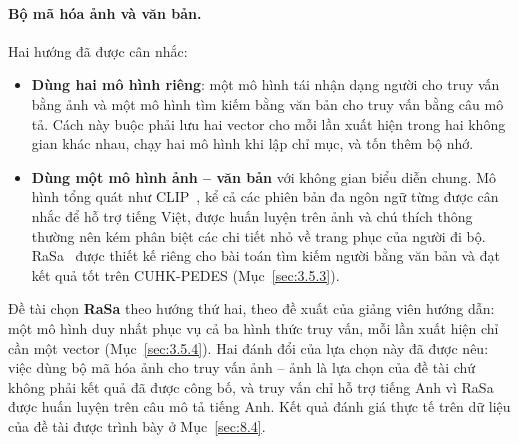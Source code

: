 \paragraph{Bộ mã hóa ảnh và văn bản.} Hai hướng đã được cân nhắc:
\begin{itemize}
    \item \textbf{Dùng hai mô hình riêng}: một mô hình tái nhận dạng người cho truy vấn bằng ảnh và một mô hình tìm kiếm bằng văn bản cho truy vấn bằng câu mô tả. Cách này buộc phải lưu hai vector cho mỗi lần xuất hiện trong hai không gian khác nhau, chạy hai mô hình khi lập chỉ mục, và tốn thêm bộ nhớ.
    \item \textbf{Dùng một mô hình ảnh -- văn bản} với không gian biểu diễn chung. Mô hình tổng quát như CLIP~\cite{radford2021clip}, kể cả các phiên bản đa ngôn ngữ từng được cân nhắc để hỗ trợ tiếng Việt, được huấn luyện trên ảnh và chú thích thông thường nên kém phân biệt các chi tiết nhỏ về trang phục của người đi bộ. RaSa~\cite{bai2023rasa} được thiết kế riêng cho bài toán tìm kiếm người bằng văn bản và đạt kết quả tốt trên CUHK-PEDES (Mục~\ref{sec:3.5.3}).
\end{itemize}
Đề tài chọn \textbf{RaSa} theo hướng thứ hai, theo đề xuất của giảng viên hướng dẫn: một mô hình duy nhất phục vụ cả ba hình thức truy vấn, mỗi lần xuất hiện chỉ cần một vector (Mục~\ref{sec:3.5.4}). Hai đánh đổi của lựa chọn này đã được nêu: việc dùng bộ mã hóa ảnh cho truy vấn ảnh -- ảnh là lựa chọn của đề tài chứ không phải kết quả đã được công bố, và truy vấn chỉ hỗ trợ tiếng Anh vì RaSa được huấn luyện trên câu mô tả tiếng Anh. Kết quả đánh giá thực tế trên dữ liệu của đề tài được trình bày ở Mục~\ref{sec:8.4}.

